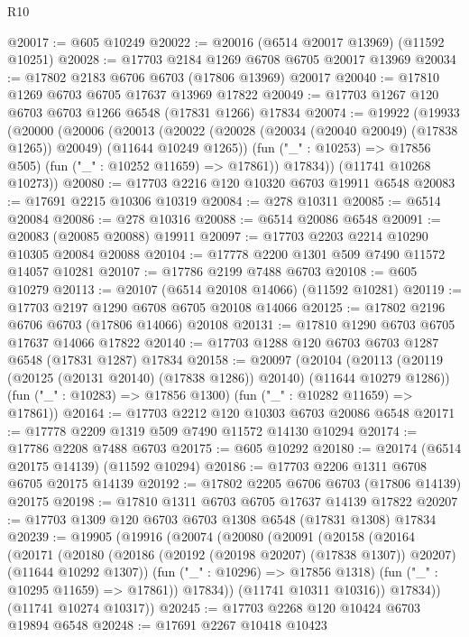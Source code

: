 \begin{lexlean}{R10}
\begin{coremodule}
@20017 := @605 @10249
@20022 := @20016 (@6514 @20017 @13969) (@11592 @10251)
@20028 := @17703 @2184 @1269 @6708 @6705 @20017 @13969
@20034 := @17802 @2183 @6706 @6703 (@17806 @13969) @20017
@20040 := @17810 @1269 @6703 @6705 @17637 @13969 @17822
@20049 := @17703 @1267 @120 @6703 @6703 @1266 @6548 (@17831 @1266) @17834
@20074 := @19922
    (@19933
      (@20000
        (@20006
          (@20013
            (@20022 (@20028 (@20034 (@20040 @20049) (@17838 @1265)) @20049) (@11644 @10249 @1265))
            (fun ("_" : @10253) => @17856 @505)
            (fun ("_" : @10252 @11659) => @17861))
          @17834))
      (@11741 @10268 @10273))
@20080 := @17703 @2216 @120 @10320 @6703 @19911 @6548
@20083 := @17691 @2215 @10306 @10319
@20084 := @278 @10311
@20085 := @6514 @20084
@20086 := @278 @10316
@20088 := @6514 @20086 @6548
@20091 := @20083 (@20085 @20088) @19911
@20097 := @17703 @2203 @2214 @10290 @10305 @20084 @20088
@20104 := @17778 @2200 @1301 @509 @7490 @11572 @14057 @10281
@20107 := @17786 @2199 @7488 @6703
@20108 := @605 @10279
@20113 := @20107 (@6514 @20108 @14066) (@11592 @10281)
@20119 := @17703 @2197 @1290 @6708 @6705 @20108 @14066
@20125 := @17802 @2196 @6706 @6703 (@17806 @14066) @20108
@20131 := @17810 @1290 @6703 @6705 @17637 @14066 @17822
@20140 := @17703 @1288 @120 @6703 @6703 @1287 @6548 (@17831 @1287) @17834
@20158 := @20097
    (@20104
      (@20113 (@20119 (@20125 (@20131 @20140) (@17838 @1286)) @20140) (@11644 @10279 @1286))
      (fun ("_" : @10283) => @17856 @1300)
      (fun ("_" : @10282 @11659) => @17861))
@20164 := @17703 @2212 @120 @10303 @6703 @20086 @6548
@20171 := @17778 @2209 @1319 @509 @7490 @11572 @14130 @10294
@20174 := @17786 @2208 @7488 @6703
@20175 := @605 @10292
@20180 := @20174 (@6514 @20175 @14139) (@11592 @10294)
@20186 := @17703 @2206 @1311 @6708 @6705 @20175 @14139
@20192 := @17802 @2205 @6706 @6703 (@17806 @14139) @20175
@20198 := @17810 @1311 @6703 @6705 @17637 @14139 @17822
@20207 := @17703 @1309 @120 @6703 @6703 @1308 @6548 (@17831 @1308) @17834
@20239 := @19905
    (@19916
      (@20074
        (@20080
          (@20091
            (@20158
              (@20164
                (@20171
                  (@20180
                    (@20186 (@20192 (@20198 @20207) (@17838 @1307)) @20207)
                    (@11644 @10292 @1307))
                  (fun ("_" : @10296) => @17856 @1318)
                  (fun ("_" : @10295 @11659) => @17861))
                @17834))
            (@11741 @10311 @10316))
          @17834))
      (@11741 @10274 @10317))
@20245 := @17703 @2268 @120 @10424 @6703 @19894 @6548
@20248 := @17691 @2267 @10418 @10423

\end{coremodule}
\end{lexlean}
